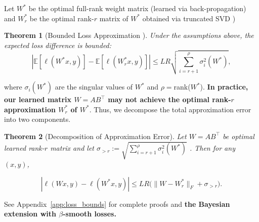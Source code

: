 \documentclass{article}
\theoremstyle{plain}
\newtheorem{theorem}{Theorem}[section]
\theoremstyle{definition}
\theoremstyle{remark}
\begin{document}
Let $W^*$ be the optimal full-rank weight matrix  (learned via back-propagation)  and $W^*_r$ be the optimal rank-$r$ matrix of $W^*$ obtained via truncated SVD \cite{eckart1936approximation})
\begin{theorem}[Bounded Loss Approximation %
] \label{thm:loss_bound}Under the assumptions above, the expected loss difference is bounded: {\small \begin{equation} |\mathbb{E}[\ell(W^* x, y)] - \mathbb{E}[\ell(W^*_r x, y)]| \leq LR \sqrt{\sum_{i=r+1}^{\rho} \sigma_i^2(W^*)}, \end{equation}} \end{theorem}
 where $\sigma_i(W^*)$ are the singular values of $W^*$ and $\rho=$rank($W^*$).
\textbf{In practice, our learned matrix $W = AB^\top$ may not achieve the optimal rank-$r$ 
approximation $W^*_r$ of $W^*$}. Thus, we decompose the total approximation error into two components.

\begin{theorem}[Decomposition of Approximation Error]
\label{thm:learned_lowrank}
Let $W = AB^\top$ be optimal learned rank-$r$ matrix and let $\sigma_{>r} := \sqrt{\sum_{i=r+1}^{\rho}\sigma_i^2(W^*)}$
.
 Then for any $(x,y)$,
{\small
\begin{equation}
|\ell(Wx, y) - \ell(W^*x, y)| \leq LR\bigl(\|W - W^*_r\|_F + \sigma_{>r}\bigr).
\end{equation}

}

\end{theorem}
See Appendix~\ref{app:loss_bounds} for complete proofs and \textbf{the Bayesian extension 
with $\beta$-smooth losses.}
\end{document}
